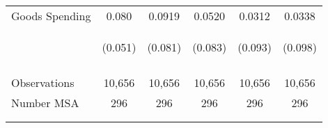 \begin{tabular}{lccccc}
    Goods Spending & 0.080 & 0.0919  & 0.0520 & 0.0312 & 0.0338 \\
    & \begin{footnotesize}(0.051)\end{footnotesize} & \begin{footnotesize}(0.081)\end{footnotesize} & \begin{footnotesize} (0.083)\end{footnotesize} & \begin{footnotesize}(0.093)\end{footnotesize} & \begin{footnotesize}(0.098)\end{footnotesize} \\
   
    \hline
    \vspace{-2pt} &  & & & & \\ 
    Observations & 10,656 & 10,656 & 10,656 & 10,656 & 10,656 \\
    Number MSA & 296 & 296 & 296 & 296 & 296 \\
    \hline \hline \\
    \vspace{-2pt} & \vspace{-2pt} & \vspace{-2pt} & \vspace{-2pt} \\
    \end{tabular}

    
   